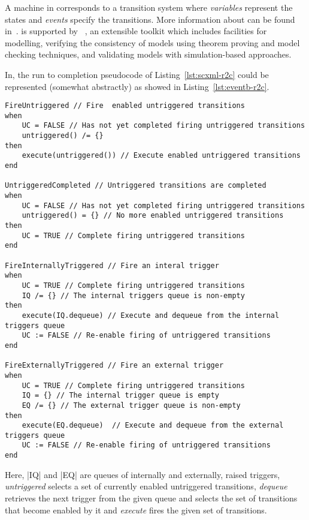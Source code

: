 A machine in \EventB corresponds to a transition system
where \emph{variables} represent the states and \emph{events} specify
the transitions.    More information about \EventB can be found in~\cite{hoang13:_introd_event_b_model_method}.  \EventB is supported by
\Rodin~\cite{abrial10:_rodin}, an extensible toolkit which includes
facilities for modelling, verifying the consistency of models
using theorem proving and model checking techniques, and validating
models with simulation-based approaches.

In, \EventB the run to completion pseudocode of Listing~\ref{lst:scxml-r2c} could be represented (somewhat abstractly) as showed in Listing~\ref{lst:eventb-r2c}.
\begin{lstlisting}[caption={Run to completion pseudocode in \EventB},label={lst:eventb-r2c}, language=Event-B, escapechar=|, frame=single]
 FireUntriggered // Fire  enabled untriggered transitions
when
    UC = FALSE // Has not yet completed firing untriggered transitions
    untriggered() /= {}
then
    execute(untriggered()) // Execute enabled untriggered transitions
end

UntriggeredCompleted // Untriggered transitions are completed
when
    UC = FALSE // Has not yet completed firing untriggered transitions
    untriggered() = {} // No more enabled untriggered transitions
then
    UC = TRUE // Complete firing untriggered transitions
end

FireInternallyTriggered // Fire an interal trigger
when
    UC = TRUE // Complete firing untriggered transitions
    IQ /= {} // The internal triggers queue is non-empty
then
    execute(IQ.dequeue) // Execute and dequeue from the internal triggers queue
    UC := FALSE // Re-enable firing of untriggered transitions
end

FireExternallyTriggered // Fire an external trigger
when
    UC = TRUE // Complete firing untriggered transitions
    IQ = {} // The internal trigger queue is empty
    EQ /= {} // The external trigger queue is non-empty
then
    execute(EQ.dequeue)  // Execute and dequeue from the external triggers queue
    UC := FALSE // Re-enable firing of untriggered transitions
end
\end{lstlisting}	
Here, |IQ| and |EQ| are queues of internally and externally, raised triggers, \emph{untriggered} selects a set of currently enabled untriggered transitions, \emph{dequeue} retrieves the next trigger from the given queue and selects the set of transitions that become enabled by it and \emph{execute} fires the given set of transitions. 
